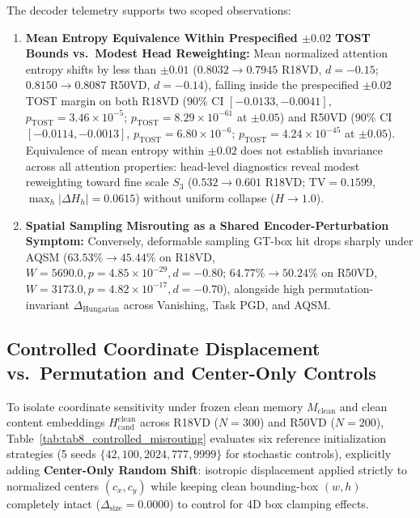 \documentclass[preprint,10pt]{elsarticle}
\begin{document}
The decoder telemetry supports two scoped observations:
\begin{enumerate}
    \item \textbf{Mean Entropy Equivalence Within Prespecified $\pm 0.02$ TOST Bounds vs.\ Modest Head Reweighting:} Mean normalized attention entropy shifts by less than $\pm 0.01$ ($0.8032 \to 0.7945$ R18VD, $d=-0.15$; $0.8150 \to 0.8087$ R50VD, $d=-0.14$), falling inside the prespecified $\pm 0.02$ TOST margin on both R18VD ($90\%$ CI $[-0.0133, -0.0041]$, $p_{\mathrm{TOST}} = 3.46 \times 10^{-5}$; $p_{\mathrm{TOST}} = 8.29 \times 10^{-61}$ at $\pm 0.05$) and R50VD ($90\%$ CI $[-0.0114, -0.0013]$, $p_{\mathrm{TOST}} = 6.80 \times 10^{-6}$; $p_{\mathrm{TOST}} = 4.24 \times 10^{-45}$ at $\pm 0.05$). Equivalence of mean entropy within $\pm 0.02$ does not establish invariance across all attention properties: head-level diagnostics reveal modest reweighting toward fine scale $S_3$ ($0.532 \to 0.601$ R18VD; $\mathrm{TV} = 0.1599$, $\max_h |\Delta H_h| = 0.0615$) without uniform collapse ($H \to 1.0$).
    \item \textbf{Spatial Sampling Misrouting as a Shared Encoder-Perturbation Symptom:} Conversely, deformable sampling GT-box hit drops sharply under AQSM ($63.53\% \to 45.44\%$ on R18VD, $W = 5690.0, p = 4.85 \times 10^{-29}, d = -0.80$; $64.77\% \to 50.24\%$ on R50VD, $W = 3173.0, p = 4.82 \times 10^{-17}, d = -0.70$), alongside high permutation-invariant $\Delta_{\mathrm{Hungarian}}$ across Vanishing, Task PGD, and AQSM.
\end{enumerate}

\subsection{Controlled Coordinate Displacement vs.\ Permutation and Center-Only Controls}
\label{sec:controlled_misrouting}
To isolate coordinate sensitivity under frozen clean memory $M_{\mathrm{clean}}$ and clean content embeddings $H_{\mathrm{cand}}^{\mathrm{clean}}$ across R18VD ($N = 300$) and R50VD ($N = 200$), Table~\ref{tab:tab8_controlled_misrouting} evaluates six reference initialization strategies (5 seeds $\{42, 100, 2024, 777, 9999\}$ for stochastic controls), explicitly adding \textbf{Center-Only Random Shift}: isotropic displacement applied strictly to normalized centers $(c_x, c_y)$ while keeping clean bounding-box $(w, h)$ completely intact ($\Delta_{\mathrm{size}} = 0.0000$) to control for 4D box clamping effects.
\end{document}
